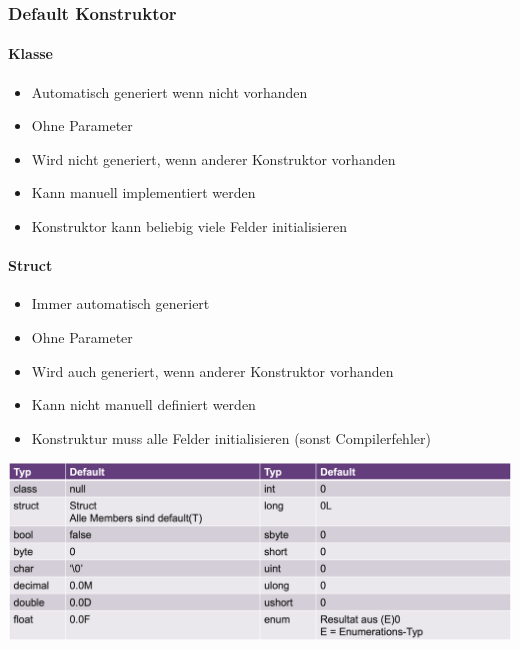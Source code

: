 \subsubsection{Default Konstruktor}
\begin{multicols}{2}
    \paragraph{Klasse}
    \begin{itemize}
        \item Automatisch generiert wenn nicht vorhanden
        \item Ohne Parameter
        \item Wird nicht generiert, wenn anderer Konstruktor vorhanden
        \item Kann manuell implementiert werden
        \item Konstruktor kann beliebig viele Felder initialisieren
    \end{itemize}
    \vfill
    \columnbreak
    \paragraph{Struct}
    \begin{itemize}
        \item Immer automatisch generiert
        \item Ohne Parameter
        \item Wird auch generiert, wenn anderer Konstruktor vorhanden
        \item Kann nicht manuell definiert werden
        \item Konstruktur muss alle Felder initialisieren (sonst Compilerfehler)
    \end{itemize}
\end{multicols}
\vspace{-8pt}
\begin{center}
\includegraphics[scale=.18]{graphic/klassen/K&S_Standard-Werte.png}
\end{center}
\vspace{-8pt}

